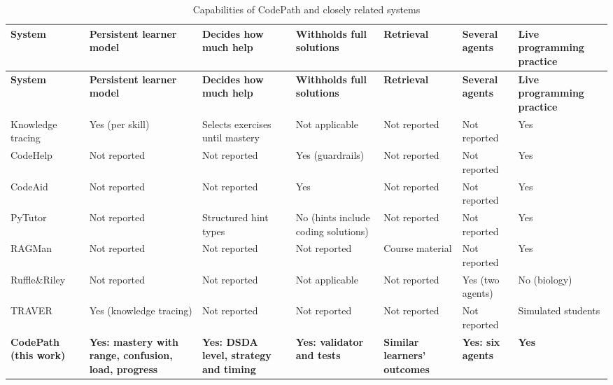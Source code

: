 \begin{landscape}
\begingroup\small
\setlength{\tabcolsep}{4pt}\renewcommand{\arraystretch}{1.2}
\begin{longtable}{|R{2.8cm}|R{3.2cm}|R{3.4cm}|R{3.0cm}|R{3.0cm}|R{2.7cm}|R{2.6cm}|}
\caption{Capabilities of CodePath and closely related systems}\label{tab:capability}\\\hline
\textbf{System} & \textbf{Persistent learner model} & \textbf{Decides how much help} & \textbf{Withholds full solutions} & \textbf{Retrieval} & \textbf{Several agents} & \textbf{Live programming practice}\\\hline\endfirsthead
\hline\textbf{System} & \textbf{Persistent learner model} & \textbf{Decides how much help} & \textbf{Withholds full solutions} & \textbf{Retrieval} & \textbf{Several agents} & \textbf{Live programming practice}\\\hline\endhead
Knowledge tracing \cite{corbett1995} & Yes (per skill) & Selects exercises until mastery & Not applicable & Not reported & Not reported & Yes\\\hline
CodeHelp \cite{liffiton2023} & Not reported & Not reported & Yes (guardrails) & Not reported & Not reported & Yes\\\hline
CodeAid \cite{kazemitabaar2024} & Not reported & Not reported & Yes & Not reported & Not reported & Yes\\\hline
PyTutor \cite{yang2024} & Not reported & Structured hint types & No (hints include coding solutions) & Not reported & Not reported & Yes\\\hline
RAGMan \cite{ma2024} & Not reported & Not reported & Not reported & Course material & Not reported & Yes\\\hline
Ruffle\&Riley \cite{schmucker2024} & Not reported & Not reported & Not applicable & Not reported & Yes (two agents) & No (biology)\\\hline
TRAVER \cite{wang2025} & Yes (knowledge tracing) & Not reported & Not reported & Not reported & Not reported & Simulated students\\\hline
\textbf{CodePath (this work)} & \textbf{Yes: mastery with range, confusion, load, progress} & \textbf{Yes: DSDA level, strategy and timing} & \textbf{Yes: validator and tests} & \textbf{Similar learners' outcomes} & \textbf{Yes: six agents} & \textbf{Yes}\\\hline
\end{longtable}
\endgroup
\end{landscape}


